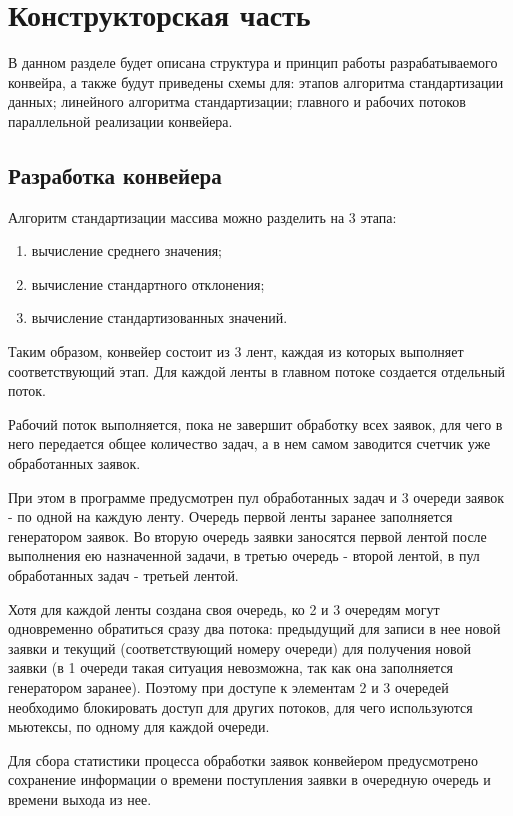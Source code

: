 \chapter{Конструкторская часть}

В данном разделе будет описана структура и принцип работы разрабатываемого конвейра, а также будут приведены схемы для: этапов алгоритма стандартизации данных; линейного алгоритма стандартизации; главного и рабочих потоков параллельной реализации конвейера.

\section{Разработка конвейера}

Алгоритм стандартизации массива можно разделить на 3 этапа:
\begin{enumerate}[label={\arabic*)}]
	\item вычисление среднего значения;
	\item вычисление стандартного отклонения;
	\item вычисление стандартизованных значений.
\end{enumerate}

Таким образом, конвейер состоит из 3 лент, каждая из которых выполняет соответствующий этап. Для каждой ленты в главном потоке создается отдельный поток. 

Рабочий поток выполняется, пока не завершит обработку всех заявок, для чего в него передается общее количество задач, а в нем самом заводится счетчик уже обработанных заявок. 


При этом в программе предусмотрен пул обработанных задач и 3 очереди заявок - по одной на каждую ленту. Очередь первой ленты заранее заполняется генератором заявок. Во вторую очередь заявки заносятся первой лентой после выполнения ею назначенной задачи, в третью очередь - второй лентой, в пул обработанных задач  - третьей лентой.

Хотя для каждой ленты создана своя очередь, ко 2 и 3 очередям могут одновременно обратиться сразу два потока: предыдущий для записи в нее новой заявки и текущий (соответствующий номеру очереди) для получения новой заявки (в 1 очереди такая ситуация невозможна, так как она заполняется генератором заранее). Поэтому при доступе к элементам 2 и 3 очередей необходимо блокировать доступ для других потоков, для чего используются мьютексы, по одному для каждой очереди.
  
Для сбора статистики процесса обработки заявок конвейером предусмотрено сохранение информации о времени поступления заявки в очередную очередь и времени выхода из нее.

